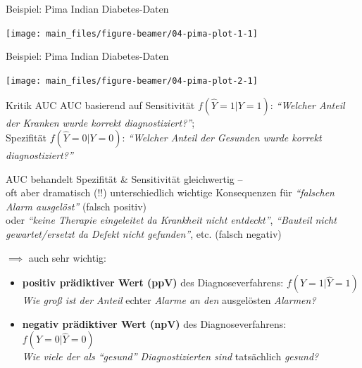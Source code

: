 \documentclass[
  10pt,
  ignorenonframetext,
]{beamer}
\providecommand{\tightlist}{%
  \setlength{\itemsep}{0pt}\setlength{\parskip}{0pt}}
\begin{document}
\begin{frame}{Beispiel: Pima Indian Diabetes-Daten}
\label{beispiel-pima-indian-diabetes-daten-2}
\scriptsize

\begin{center}\texttt{[image: main\_files/figure-beamer/04-pima-plot-1-1]} \end{center}

\normalsize
\end{frame}

\begin{frame}{Beispiel: Pima Indian Diabetes-Daten}
\label{beispiel-pima-indian-diabetes-daten-3}
\scriptsize

\begin{center}\texttt{[image: main\_files/figure-beamer/04-pima-plot-2-1]} \end{center}

\normalsize
\end{frame}

\begin{frame}{Kritik AUC}
\label{kritik-auc}
AUC basierend auf Sensitivität \(f(\hat Y = 1| Y = 1)\): \emph{``Welcher
Anteil der Kranken wurde korrekt diagnostiziert?''};\\
Spezifität \(f(\hat Y = 0| Y = 0)\): \emph{``Welcher Anteil der Gesunden
wurde korrekt diagnostiziert?''}

AUC behandelt Spezifität \& Sensitivität gleichwertig --\\
oft aber dramatisch (!!) unterschiedlich wichtige Konsequenzen für
\emph{``falschen Alarm ausgelöst''} (falsch positiv)\\
oder \emph{``keine Therapie eingeleitet da Krankheit nicht entdeckt''},
\emph{``Bauteil nicht gewartet/ersetzt da Defekt nicht gefunden''}, etc.
(falsch negativ)

\(\implies\) auch sehr wichtig:

\begin{itemize}
\tightlist
\item
  \textbf{positiv prädiktiver Wert (ppV)} des Diagnoseverfahrens:
  \(f(Y = 1| \hat Y = 1)\)\\
  \emph{Wie groß ist der Anteil} echter \emph{Alarme an den} ausgelösten
  \emph{Alarmen?}
\item
  \textbf{negativ prädiktiver Wert (npV)} des Diagnoseverfahrens:
  \(f(Y = 0| \hat Y = 0)\)\\
  \emph{Wie viele der als ``gesund'' Diagnostizierten sind} tatsächlich
  \emph{gesund?}
\end{itemize}
\end{frame}
\end{document}
